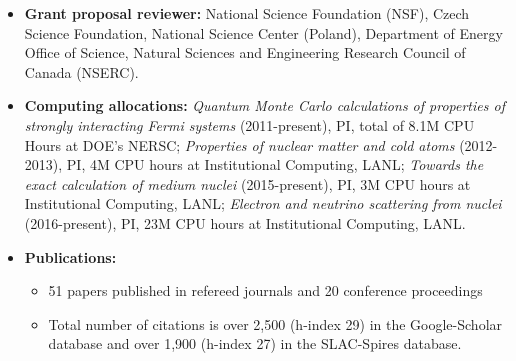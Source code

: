 \documentclass[11pt]{article}
\begin{document}
\begin{itemize}
\item {\bf Grant proposal reviewer:}
National Science Foundation (NSF), Czech Science Foundation, National Science Center (Poland),
Department of Energy Office of Science, Natural Sciences and Engineering Research Council of Canada (NSERC).

\item {\bf Computing allocations:}
\emph{Quantum Monte Carlo calculations of properties of strongly interacting Fermi systems} 
(2011-present), PI, total of 8.1M CPU Hours at DOE's NERSC;
\emph{Properties of nuclear matter and cold atoms} (2012-2013), PI, 4M CPU hours at Institutional 
Computing, LANL;
\emph{Towards the exact calculation of medium nuclei} (2015-present), PI, 3M CPU hours at Institutional
Computing, LANL;
\emph{Electron and neutrino scattering from nuclei} (2016-present), PI, 23M CPU hours at Institutional 
Computing, LANL.




\item{\bf Publications:}
\begin{itemize}
\item  51 papers published in refereed journals and 20 conference proceedings
\item Total number of citations is over 2,500 (h-index 29) in the Google-Scholar database
and over 1,900 (h-index 27) in the SLAC-Spires database.
\end{itemize}
 

\end{itemize}
\end{document}
